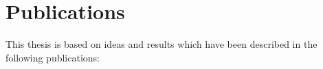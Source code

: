 

\chapter*{Publications} %

This thesis is based on ideas and results which have been described in the following publications:

\bigskip

\begin{refsection}
\nocite{SteuwerKeGo2010}
\nocite{SteuwerKeGo2011}
\nocite{KesslerGoEmDaStKe2011}
\nocite{SteuwerGoBuBr2012}
\nocite{SteuwerKeGo2012}
\nocite{SteuwerKeGo2012a}
\nocite{KegelStGo2013}
\nocite{SteuwerGo2013}
\nocite{SteuwerGo2013a}
\nocite{SteuwerFrAlGo2014}
\nocite{OlejnikStGoHe2014}
\nocite{GorlatchSt2014}
\nocite{SteuwerHaBrGo2014}
\nocite{BreuerStGo2014}
\nocite{SteuwerGo2014}
\nocite{SteuwerFeDu2015}
\nocite{SteuwerFeLiDu2015}


  {\list{}
    {\setlength{\leftmargin}{\bibhang}%
     \setlength{\itemindent}{-\leftmargin}%
     \setlength{\itemsep}{\bibitemsep}%
     \setlength{\parsep}{\bibparsep}}}
  {\endlist}
  {\item}

\begingroup
{}
\printbibliography[env=nonumbers,heading=none,sorting=ynt,omitnumbers=true,keyword=based-on]
\endgroup

\end{refsection}

